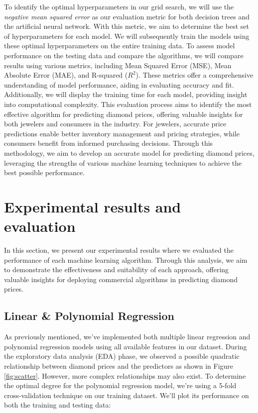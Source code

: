 \documentclass[conference]{IEEEtran}
\begin{document}
To identify the optimal hyperparameters in our grid search, we will use the \emph{negative mean squared error} as our evaluation metric for both decision trees and the artificial neural network. With this metric, we aim to determine the best set of hyperparameters for each model. We will subsequently train the models using these optimal hyperparameters on the entire training data. To assess model performance on the testing data and compare the algorithms, we will compare results using various metrics, including Mean Squared Error (MSE), Mean Absolute Error (MAE), and R-squared ($R^2$). These metrics offer a comprehensive understanding of model performance, aiding in evaluating accuracy and fit. Additionally, we will display the training time for each model, providing insight into computational complexity. This evaluation process aims to identify the most effective algorithm for predicting diamond prices, offering valuable insights for both jewelers and consumers in the industry. For jewelers, accurate price predictions enable better inventory management and pricing strategies, while consumers benefit from informed purchasing decisions. Through this methodology, we aim to develop an accurate model for predicting diamond prices, leveraging the strengths of various machine learning techniques to achieve the best possible performance.

\section{Experimental results and evaluation}

In this section, we present our experimental results where we evaluated the performance of each machine learning algorithm. Through this analysis, we aim to demonstrate the effectiveness and suitability of each approach, offering valuable insights for deploying commercial algorithms in predicting diamond prices.

\subsection{Linear \& Polynomial Regression}

As previously mentioned, we've implemented both multiple linear regression and polynomial regression models using all available features in our dataset. During the exploratory data analysis (EDA) phase, we observed a possible quadratic relationship between diamond prices and the predictors as shown in Figure \ref{fig:scatter}. However, more complex relationships may also exist. To determine the optimal degree for the polynomial regression model, we're using a 5-fold cross-validation technique on our training dataset. We'll plot its performance on both the training and testing data:
\end{document}
